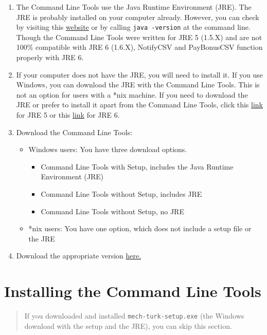 \documentclass[10pt]{article}
\begin{document}
\begin{enumerate}
	\item The Command Line Tools use the Java Runtime Environment (JRE). The JRE is probably installed on your computer already. However, you can check by visiting this 					\href{http://javatester.org/version.html}{website} or by calling \verb+java -version+ at the command line. Though the Command Line Tools were written for JRE 5 (1.5.X) and are not 100\% compatible with JRE 6 (1.6.X), NotifyCSV and PayBonusCSV function properly with JRE 6. 
	\item If your computer does not have the JRE, you will need to install it. If you use Windows, you can download the JRE with the Command Line Tools. This is not an option for users with a *nix machine. If you need to download the JRE or prefer to install it apart from the Command Line Tools, click this \href{java.sun.com/javase/downloads/index_jdk5.jsp}{link} for JRE 5 or this \href{http://java.com/en/download/index.jsp}{link} for JRE 6.
	\item Download the Command Line Tools:
	\begin{itemize}
		\item Windows users: You have three download options. 
			\begin{itemize}
				\item Command Line Tools with Setup, includes the Java Runtime Environment (JRE)
				\item Command Line Tools without Setup, includes JRE 
				\item Command Line Tools without Setup, no JRE
			\end{itemize}
		\item *nix users: You have one option, which does not include a setup file or the JRE
	\end{itemize}
	\item Download the appropriate version \href{http://aws.amazon.com/developertools/694}{here.}
\end{enumerate}

\section*{Installing the Command Line Tools}

\begin{quotation}
If you downloaded and installed \verb+mech-turk-setup.exe+ (the Windows download with the setup and the JRE), you can skip this section.
\end{quotation}
\end{document}
